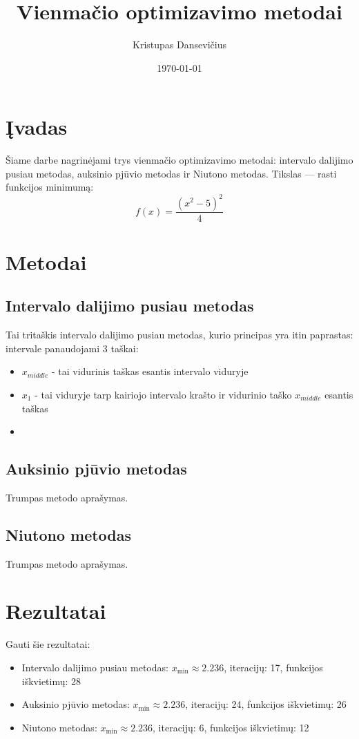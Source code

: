 \documentclass[a4paper,12pt]{article}
\title{Vienmačio optimizavimo metodai}
\author{Kristupas Dansevičius}
\date{\today}
\begin{document}
\maketitle

\section{Įvadas}
Šiame darbe nagrinėjami trys vienmačio optimizavimo metodai:
intervalo dalijimo pusiau metodas, auksinio pjūvio metodas ir Niutono metodas. 
Tikslas --- rasti funkcijos minimumą:
\[
f(x) = \frac{(x^2 - 5)^2}{4}
\]

\section{Metodai}
\subsection{Intervalo dalijimo pusiau metodas}
Tai tritaškis intervalo dalijimo pusiau metodas, kurio principas yra itin paprastas:
intervale panaudojami 3 taškai:
\begin{itemize}
    \item $x_{middle}$ - tai vidurinis taškas esantis intervalo viduryje
    \item $x_1$ - tai viduryje tarp kairiojo intervalo krašto ir vidurinio taško $x_{middle}$ esantis taškas
    \item 
\end{itemize}

\subsection{Auksinio pjūvio metodas}
Trumpas metodo aprašymas.

\subsection{Niutono metodas}
Trumpas metodo aprašymas.

\section{Rezultatai}
Gauti šie rezultatai:

\begin{itemize}
    \item Intervalo dalijimo pusiau metodas: 
        $x_{\min} \approx 2.236$, iteracijų: 17, funkcijos iškvietimų: 28
    \item Auksinio pjūvio metodas:
        $x_{\min} \approx 2.236$, iteracijų: 24, funkcijos iškvietimų: 26
    \item Niutono metodas:
        $x_{\min} \approx 2.236$, iteracijų: 6, funkcijos iškvietimų: 12
\end{itemize}
\end{document}

